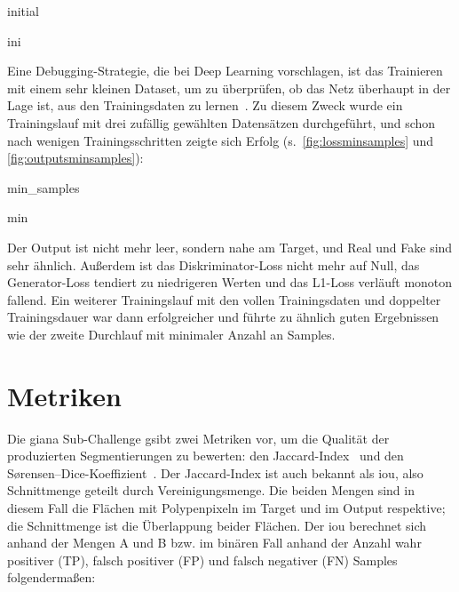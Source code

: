 \begin{outputs}{initial}
	\caption{Initialer Trainingslauf: ein Datensatz und die dazugehörige Ausgabe des Netzes.}
	\label{fig:outputsini}
\end{outputs}

\begin{losseswoiou}{ini}
	\caption[Verläufe des initialen Trainingslaufs]{Verläufe des initialen Trainingslaufs (x: Trainingsschritt, y: Wert)}
	\label{fig:lossini}
\end{losseswoiou}

Eine Debugging-Strategie, die \citeauthor{Goodfellow.2016} bei Deep Learning vorschlagen, ist das Trainieren mit einem sehr kleinen Dataset, um zu überprüfen, ob das Netz überhaupt in der Lage ist, aus den Trainingsdaten zu lernen~\cite{Goodfellow.2016}.
Zu diesem Zweck wurde ein Trainingslauf mit drei zufällig gewählten Datensätzen durchgeführt, und schon nach wenigen Trainingsschritten zeigte sich Erfolg (s.~\autoref{fig:lossminsamples} und \autoref{fig:outputsminsamples}):

\begin{losseswoiou}{min_samples}
	\caption{Verläufe des Durchlaufs mit minimaler Anzahl Samples}
	\label{fig:lossminsamples}
\end{losseswoiou}

\begin{outputs}{min}
	\caption{Datensatz und Ausgabe des Durchlaufs mit minimaler Anzahl Samples}
	\label{fig:outputsminsamples}
\end{outputs}

Der Output ist nicht mehr leer, sondern nahe am Target, und Real und Fake sind sehr ähnlich.
Außerdem ist das Diskriminator-Loss nicht mehr auf Null, das Generator-Loss tendiert zu niedrigeren Werten und das L1-Loss verläuft monoton fallend.
Ein weiterer Trainingslauf mit den vollen Trainingsdaten und doppelter Trainingsdauer war dann erfolgreicher und führte zu ähnlich guten Ergebnissen wie der zweite Durchlauf mit minimaler Anzahl an Samples.



\section{Metriken}

Die \gls{giana} Sub-Challenge gsibt zwei Metriken vor, um die Qualität der produzierten Segmentierungen zu bewerten: den Jaccard-Index~\cite{Jaccard.1901} und den Sørensen–Dice-Koeffizient~\cite{Srensen.1948,Dice.1945}.
Der Jaccard-Index ist auch bekannt als \gls{iou}, also Schnittmenge geteilt durch Vereinigungsmenge.
Die beiden Mengen sind in diesem Fall die Flächen mit Polypenpixeln im Target und im Output respektive; die Schnittmenge ist die Überlappung beider Flächen.
Der \gls{iou} berechnet sich anhand der Mengen A und B bzw. im binären Fall anhand der Anzahl wahr positiver (TP), falsch positiver (FP) und falsch negativer (FN) Samples folgendermaßen:


